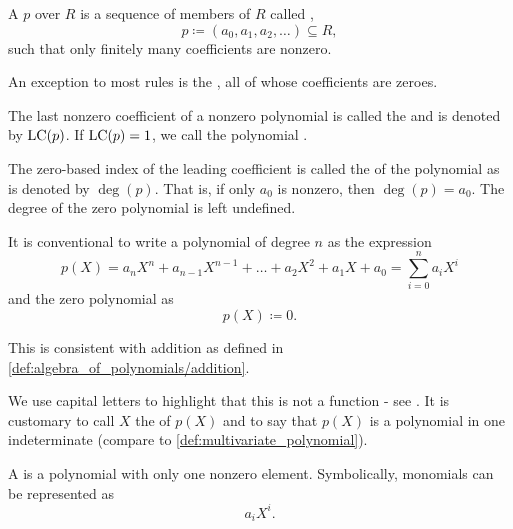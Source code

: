 \begin{definition}\label{def:polynomial}\cite[149]{Knapp2016BAlg}
  A  \( p \) over \( R \) is a sequence of members of \( R \) called ,
  \begin{equation*}
    p \coloneqq ( a_0, a_1, a_2, \ldots ) \subseteq R,
  \end{equation*}
  such that only finitely many coefficients are nonzero.

  \begin{defenum}
     An exception to most rules is the , all of whose coefficients are zeroes.

     The last nonzero coefficient of a nonzero polynomial is called the  and is denoted by \( \operatorname{LC}(p) \). If \( \operatorname{LC}(p) = 1 \), we call the polynomial .

     The zero-based index of the leading coefficient is called the  of the polynomial as is denoted by \( \deg(p) \). That is, if only \( a_0 \) is nonzero, then \( \deg(p) = a_0 \). The degree of the zero polynomial is left undefined.

     It is conventional to write a polynomial of degree \( n \) as the expression
    \begin{equation*}
      p(X) = a_n X^n + a_{n-1} X^{n-1} + \ldots + a_2 X^2 + a_1 X + a_0 = \sum_{i=0}^n a_i X^i
    \end{equation*}
    and the zero polynomial as
    \begin{equation*}
      p(X) \coloneqq 0.
    \end{equation*}

    This is consistent with addition as defined in \cref{def:algebra_of_polynomials/addition}.

    We use capital letters to highlight that this is not a function - see . It is customary to call \( X \) the  of \( p(X) \) and to say that \( p(X) \) is a polynomial in one indeterminate (compare to \cref{def:multivariate_polynomial}).

     A  is a polynomial with only one nonzero element. Symbolically, monomials can be represented as
    \begin{equation*}
      a_i X^i.
    \end{equation*}


\end{defenum}
\end{definition}
